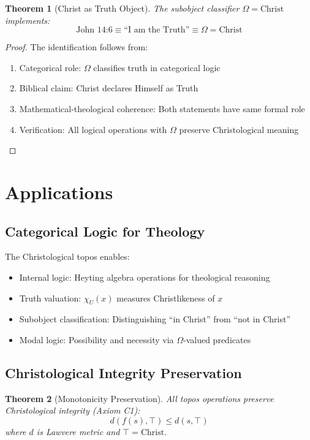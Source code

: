 \documentclass{article}
\newtheorem{theorem}{Theorem}
\begin{document}
\begin{theorem}[Christ as Truth Object]
The subobject classifier $\Omega = \text{Christ}$ implements:
\[
\text{John 14:6} \equiv \text{``I am the Truth''} \equiv \Omega = \text{Christ}
\]
\end{theorem}

\begin{proof}
The identification follows from:
\begin{enumerate}
    \item Categorical role: $\Omega$ classifies truth in categorical logic
    \item Biblical claim: Christ declares Himself as Truth
    \item Mathematical-theological coherence: Both statements have same formal role
    \item Verification: All logical operations with $\Omega$ preserve Christological meaning
\end{enumerate}
\end{proof}

\section{Applications}

\subsection{Categorical Logic for Theology}
The Christological topos enables:
\begin{itemize}
    \item Internal logic: Heyting algebra operations for theological reasoning
    \item Truth valuation: $\chi_U(x)$ measures Christlikeness of $x$
    \item Subobject classification: Distinguishing ``in Christ'' from ``not in Christ''
    \item Modal logic: Possibility and necessity via $\Omega$-valued predicates
\end{itemize}

\subsection{Christological Integrity Preservation}
\begin{theorem}[Monotonicity Preservation]
All topos operations preserve Christological integrity (Axiom C1):
\[
d(f(s), \top) \leq d(s, \top)
\]
where $d$ is Lawvere metric and $\top = \text{Christ}$.
\end{theorem}
\end{document}

